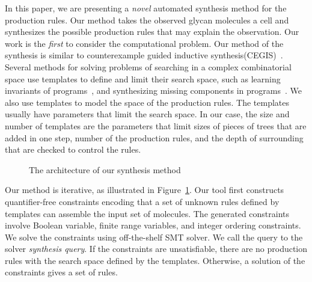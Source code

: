 In this paper, we are presenting a {\em novel} automated synthesis
method for the production rules.
Our method takes the observed glycan molecules a cell and synthesizes
the possible production rules that may explain the observation.
Our work is the {\em first} to consider the computational problem.
Our method of the synthesis is similar to counterexample guided
inductive synthesis(CEGIS)~\cite{cegis}.
Several methods for solving problems of searching in a complex combinatorial
space use templates to define and limit their search space,
such as learning invariants of programs~\cite{InvGenTACAS09},
and synthesizing missing components in programs~\cite{sygus,Solar-Lezama2005}.
We also use templates to model the space of the production rules.
The templates usually have parameters that limit the search space.
In our case, the size and number of templates are the parameters that
limit sizes of pieces of trees that are added in one step,
number of the production rules, and
the depth of surrounding that are checked to control the rules.

\begin{figure}[t]
  \caption{The architecture of our synthesis method}
  \label{fig:illus-method}
\end{figure}

Our method is iterative, as illustrated in Figure~\ref{fig:illus-method}.
Our tool first constructs quantifier-free constraints encoding that a set of unknown rules
defined by templates can assemble the input set of molecules.
The generated constraints involve Boolean variable, finite range variables, and integer ordering
constraints.
We solve the constraints using off-the-shelf SMT solver.
We call the query to the solver {\em synthesis query}.
If the constraints are unsatisfiable, there are no production rules with the search space
defined by the templates.
Otherwise, a solution of the constraints gives a set of rules.


